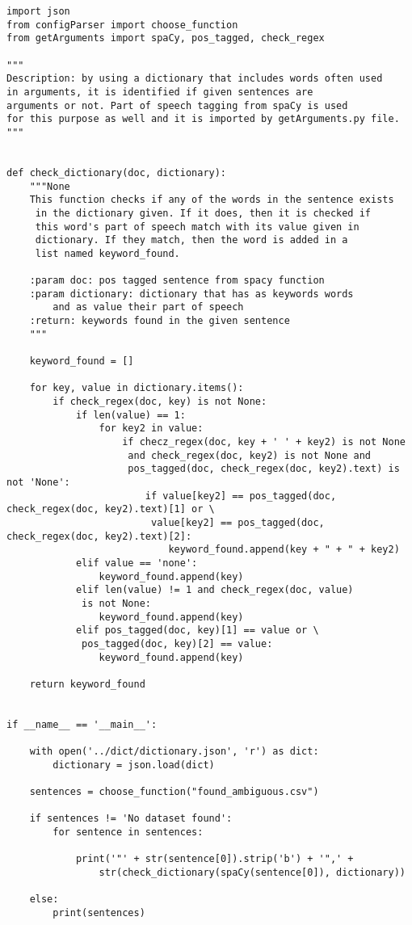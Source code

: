 \begin{lstlisting}[language=iPython]
import json
from configParser import choose_function
from getArguments import spaCy, pos_tagged, check_regex

"""
Description: by using a dictionary that includes words often used 
in arguments, it is identified if given sentences are 
arguments or not. Part of speech tagging from spaCy is used 
for this purpose as well and it is imported by getArguments.py file.
"""


def check_dictionary(doc, dictionary):
	"""None
	This function checks if any of the words in the sentence exists
	 in the dictionary given. If it does, then it is checked if 
	 this word's part of speech match with its value given in 
	 dictionary. If they match, then the word is added in a 
	 list named keyword_found.
	
	:param doc: pos tagged sentence from spacy function
	:param dictionary: dictionary that has as keywords words 
		and as value their part of speech
	:return: keywords found in the given sentence
	"""
	
	keyword_found = []
	
	for key, value in dictionary.items():
		if check_regex(doc, key) is not None:
			if len(value) == 1:
				for key2 in value:
					if checz_regex(doc, key + ' ' + key2) is not None 
					 and check_regex(doc, key2) is not None and 
					 pos_tagged(doc, check_regex(doc, key2).text) is not 'None':
						if value[key2] == pos_tagged(doc, check_regex(doc, key2).text)[1] or \
						 value[key2] == pos_tagged(doc, check_regex(doc, key2).text)[2]:
							keyword_found.append(key + " + " + key2)
			elif value == 'none':
				keyword_found.append(key)
			elif len(value) != 1 and check_regex(doc, value) 
			 is not None:
				keyword_found.append(key)
			elif pos_tagged(doc, key)[1] == value or \
			 pos_tagged(doc, key)[2] == value:
				keyword_found.append(key)
	
	return keyword_found


if __name__ == '__main__':

	with open('../dict/dictionary.json', 'r') as dict:
		dictionary = json.load(dict)
	
	sentences = choose_function("found_ambiguous.csv")
	
	if sentences != 'No dataset found':
		for sentence in sentences:
		
			print('"' + str(sentence[0]).strip('b') + '",' + 
				str(check_dictionary(spaCy(sentence[0]), dictionary))
		
	else:
		print(sentences)
\end{lstlisting}
